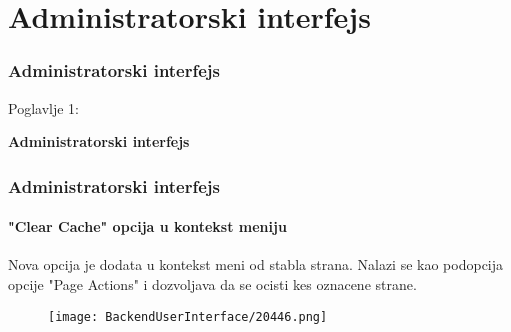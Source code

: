 %

\section{Administratorski interfejs}
\begin{frame}[fragile]
	\frametitle{Administratorski interfejs}

	\begin{center}\huge{Poglavlje 1:}\end{center}
	\begin{center}\huge{\color{typo3darkgrey}\textbf{Administratorski interfejs}}\end{center}

\end{frame}

\begin{frame}[fragile]
	\frametitle{Administratorski interfejs}
	\framesubtitle{"Clear Cache" opcija u kontekst meniju}

	Nova opcija je dodata u kontekst meni od stabla strana. Nalazi se kao podopcija opcije "Page Actions" 
	i dozvoljava da se ocisti kes oznacene strane.

	\begin{figure}
		\texttt{[image: BackendUserInterface/20446.png]}
	\end{figure}

\end{frame}

